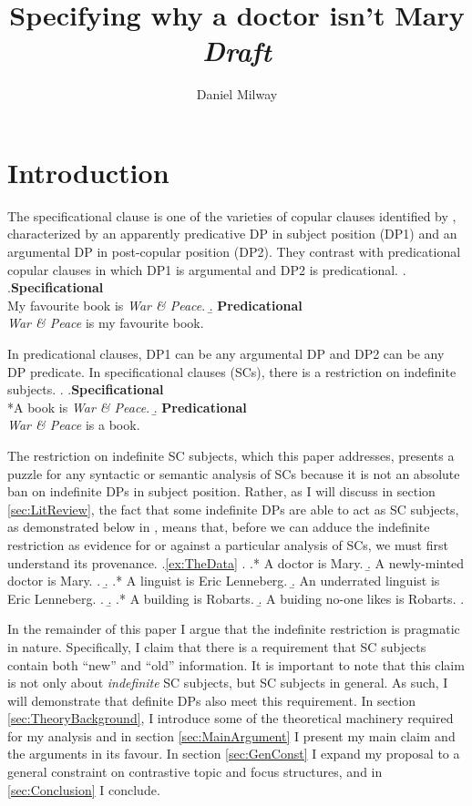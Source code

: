 \documentclass[letterpaper]{article}
\title{Specifying why a doctor isn't Mary\\\textit{Draft}}
\author{Daniel Milway}
\begin{document}
\maketitle
\doublespacing
\section{Introduction}
The specificational clause is one of the varieties of copular clauses identified by \textcite{higgins1973pseudo}, characterized by an apparently predicative DP in subject position (DP1) and an argumental DP in post-copular position (DP2).
They contrast with predicational copular clauses in which DP1 is argumental and DP2 is predicational.
\ex.
\a.\textbf{Specificational}\\
My favourite book is \textit{War \& Peace}.
\b. \textbf{Predicational}\\
\textit{War \& Peace} is my favourite book.

In predicational clauses, DP1 can be any argumental DP and DP2 can be any DP predicate.
In specificational clauses (SCs), there is a restriction on indefinite subjects.
\ex.\label{ex:TheData}
\a.\textbf{Specificational}\\
*A book is \textit{War \& Peace}.
\b. \textbf{Predicational}\\
\textit{War \& Peace} is a book.

The restriction on indefinite SC subjects, which this paper addresses, presents a puzzle for any syntactic or semantic analysis of SCs because it is not an absolute ban on indefinite DPs in subject position.
Rather, as I will discuss in section \ref{sec:LitReview}, the fact that some indefinite DPs are able to act as SC subjects, as demonstrated below in \Next, means that, before we can adduce the indefinite restriction as evidence for or against a particular analysis of SCs, we must first understand its provenance.
\ex.\ref{ex:TheData} 
\a.
\a.* A doctor is Mary.
\b. A newly-minted doctor is Mary.
\z.
\b.
\a.* A linguist is Eric Lenneberg.
\b. An underrated linguist is Eric Lenneberg.
\z.
\b.
\a.* A building is Robarts.
\b. A buiding no-one likes is Robarts.
\z.

In the remainder of this paper I argue that the indefinite restriction is pragmatic in nature.
Specifically, I claim that there is a requirement that SC subjects contain both ``new'' and ``old'' information.
It is important to note that this claim is not only about \textit{indefinite} SC subjects, but SC subjects in general.
As such, I will demonstrate that definite DPs also meet this requirement.
In section \ref{sec:TheoryBackground}, I introduce some of the theoretical machinery required for my analysis and in section \ref{sec:MainArgument} I present my main claim and the arguments in its favour.
In section \ref{sec:GenConst} I expand my proposal to a general constraint on contrastive topic and focus structures, and in \ref{sec:Conclusion} I conclude.
\end{document}

